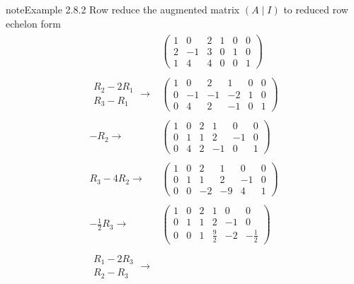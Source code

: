 \documentclass[letterpaper,10pt,english]{jupyterBook}
\begin{document}
\begin{sphinxadmonition}{note}{Example 2.8.2}
\sphinxAtStartPar
Row reduce the augmented matrix \((A \mid I)\) to reduced row echelon form
\begin{equation*}
\begin{split} \begin{align*}
    &\left( \begin{array}{ccc|ccc}
      1 & 0 & 2 & 1 & 0 & 0 \\
      2 & -1 & 3 & 0 & 1 & 0 \\
      1 & 4 & 4 & 0 & 0 & 1
    \end{array} \right)
     \\ \\
    \begin{array}{l} R_2 - 2R_1 \\ R_3 - R_1 \end{array} \longrightarrow
    &\left( \begin{array}{ccc|ccc}
      1 & 0 & 2 & 1 & 0 & 0 \\
      0 & -1 & -1 & -2 & 1 & 0 \\
      0 & 4 & 2 & -1 & 0 & 1
    \end{array} \right)
    \\ \\
    -R_2\longrightarrow
    &\left( \begin{array}{ccc|ccc}
      1 & 0 & 2 & 1 & 0 & 0 \\
      0 & 1 & 1 & 2 & -1 & 0 \\
      0 & 4 & 2 & -1 & 0 & 1
    \end{array} \right)
    \\ \\
    R_3 - 4R_2 \longrightarrow
    &\left( \begin{array}{ccc|ccc}
      1 & 0 & 2 & 1 & 0 & 0 \\
      0 & 1 & 1 & 2 & -1 & 0 \\
      0 & 0 & -2 & -9 & 4 & 1
    \end{array} \right)
    \\ \\
    -\frac{1}{2}R_3 \longrightarrow
    &\left( \begin{array}{ccc|ccc}
      1 & 0 & 2 & 1 & 0 & 0 \\
      0 & 1 & 1 & 2 & -1 & 0 \\
      0 & 0 & 1 & \frac{9}{2} & -2 & -\frac{1}{2}
    \end{array} \right)
    \\ \\
    \begin{array}{l} R_1 - 2R_3 \\ R_2 - R_3 \end{array}  \longrightarrow

\end{align*}
\end{split}
\end{equation*}
\end{sphinxadmonition}
\end{document}
